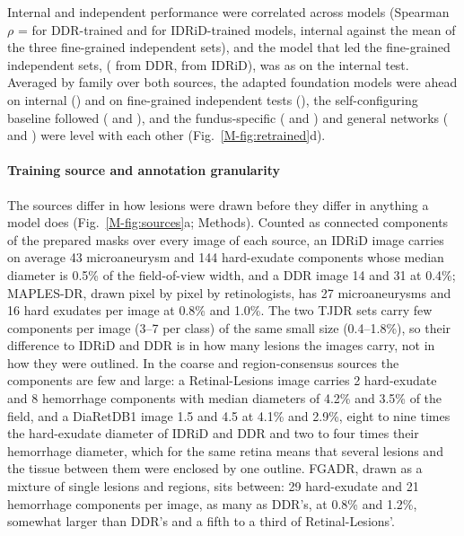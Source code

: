 Internal and independent performance were correlated across models (Spearman $\rho$ =  for DDR-trained and  for IDRiD-trained models, internal \mAUPR{} against the mean of the three fine-grained independent sets), and the model that led the fine-grained independent sets,  ( from DDR,  from IDRiD), was  as on the internal test. Averaged by family over both sources, the adapted foundation models were ahead on internal () and on fine-grained independent tests (), the self-configuring baseline followed ( and ), and the fundus-specific ( and ) and general networks ( and ) were level with each other (Fig.~\ref{M-fig:retrained}d).

\paragraph{Training source and annotation granularity}

The sources differ in how lesions were drawn before they differ in anything a model does (Fig.~\ref{M-fig:sources}a; Methods). Counted as connected components of the prepared masks over every image of each source, an IDRiD image carries on average 43 microaneurysm and 144 hard-exudate components whose median diameter is 0.5\% of the field-of-view width, and a DDR image 14 and 31 at 0.4\%; MAPLES-DR, drawn pixel by pixel by retinologists, has 27 microaneurysms and 16 hard exudates per image at 0.8\% and 1.0\%. The two TJDR sets carry few components per image (3--7 per class) of the same small size (0.4--1.8\%), so their difference to IDRiD and DDR is in how many lesions the images carry, not in how they were outlined. In the coarse and region-consensus sources the components are few and large: a Retinal-Lesions image carries 2 hard-exudate and 8 hemorrhage components with median diameters of 4.2\% and 3.5\% of the field, and a DiaRetDB1 image 1.5 and 4.5 at 4.1\% and 2.9\%, eight to nine times the hard-exudate diameter of IDRiD and DDR and two to four times their hemorrhage diameter, which for the same retina means that several lesions and the tissue between them were enclosed by one outline. FGADR, drawn as a mixture of single lesions and regions, sits between: 29 hard-exudate and 21 hemorrhage components per image, as many as DDR's, at 0.8\% and 1.2\%, somewhat larger than DDR's and a fifth to a third of Retinal-Lesions'.

